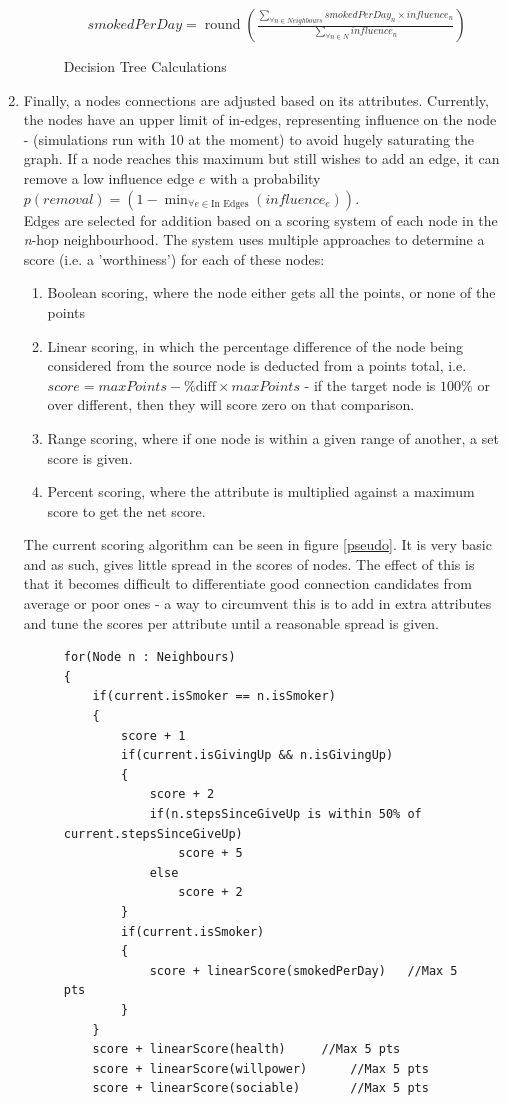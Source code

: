 \documentclass[]{article}
\begin{document}
\begin{enumerate}
\begin{figure}[h]
\begin{enumerate}
		$smokedPerDay = \operatorname{round}(\frac{\sum_{\forall n \in Neighbours} smokedPerDay_{n} \times influence_{n}}{\sum_{\forall n \in N} influence_{n}})$
	\end{enumerate}
	\label{decTreeProbs}
	\caption{Decision Tree Calculations}
\end{figure}

\item Finally, a nodes connections are adjusted based on its attributes. Currently, the nodes have an upper limit of in-edges, representing influence on the node - (simulations run with 10 at the moment) to avoid hugely saturating the graph. If a node reaches this maximum but still wishes to add an edge, it can remove a low influence edge $e$ with a probability $p(removal) = (1 - \operatorname{min}_{\forall e \in \text{In Edges}}(influence_{e}))$.
\\
Edges are selected for addition based on a scoring system of each node in the \emph{n}-hop neighbourhood. The system uses multiple approaches to determine a score (i.e. a 'worthiness') for each of these nodes:
\begin{enumerate}
\item Boolean scoring, where the node either gets all the points, or none of the points
\item Linear scoring, in which the percentage difference of the node being considered from the source node is deducted from a points total, i.e. $score = maxPoints - \text{\% diff} \times maxPoints$ - if the target node is $100\%$ or over different, then they will score zero on that comparison.
\item Range scoring, where if one node is within a given range of another, a set score is given.
\item Percent scoring, where the attribute is multiplied against a maximum score to get the net score. 
\end{enumerate}
The current scoring algorithm can be seen in figure \ref{pseudo}. It is very basic and as such, gives little spread in the scores of nodes. The effect of this is that it becomes difficult to differentiate good connection candidates from average or poor ones - a way to circumvent this is to add in extra attributes and tune the scores per attribute until a reasonable spread is given.

\begin{figure}[h]
\begin{center}
	\begin{lstlisting}
for(Node n : Neighbours)
{
	if(current.isSmoker == n.isSmoker)
	{
		score + 1
		if(current.isGivingUp && n.isGivingUp)
		{
			score + 2
			if(n.stepsSinceGiveUp is within 50% of current.stepsSinceGiveUp)
				score + 5
			else
				score + 2
		}
		if(current.isSmoker)
		{
			score + linearScore(smokedPerDay) 	//Max 5 pts
		}
	}
	score + linearScore(health)		//Max 5 pts
	score + linearScore(willpower)		//Max 5 pts
	score + linearScore(sociable)		//Max 5 pts


\end{lstlisting}
\end{center}
\end{figure}
\end{enumerate}
\end{document}
